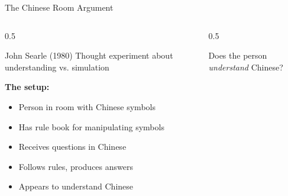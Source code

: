 \documentclass[aspectratio=169]{beamer}
\begin{document}
\begin{frame}[shrink=5]{The Chinese Room Argument 🏮}
\begin{columns}
\begin{column}{0.5\textwidth}
\small
\begin{block}{John Searle (1980)}
Thought experiment about understanding vs. simulation
\end{block}

\vspace{0.2cm}

\textbf{The setup:}
\begin{itemize}\setlength{\itemsep}{0pt}\setlength{\itemsep}{0pt}
    \item Person in room with Chinese symbols
    \item Has rule book for manipulating symbols
    \item Receives questions in Chinese
    \item Follows rules, produces answers
    \item Appears to understand Chinese
\end{itemize}
\end{column}

\begin{column}{0.5\textwidth}
\begin{center}
\end{center}

\vspace{0.1cm}

\small
\begin{thinkaboutit}
Does the person \textit{understand} Chinese?
\end{thinkaboutit}
\end{column}
\end{columns}
\end{frame}
\end{document}
